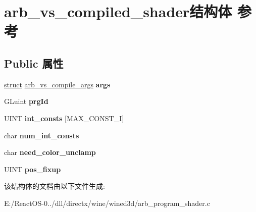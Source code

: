 \hypertarget{structarb__vs__compiled__shader}{}\section{arb\+\_\+vs\+\_\+compiled\+\_\+shader结构体 参考}
\label{structarb__vs__compiled__shader}
\subsection*{Public 属性}
\begin{DoxyCompactItemize}
\item 
\mbox{\label{structarb__vs__compiled__shader_ac6e368bfd741072b3b78e7366f7196ef}} 
\hyperlink{interfacestruct}{struct} \hyperlink{structarb__vs__compile__args}{arb\+\_\+vs\+\_\+compile\+\_\+args} {\bfseries args}
\item 
\mbox{\label{structarb__vs__compiled__shader_a8d98032739e6d1d913771788110fcd26}} 
G\+Luint {\bfseries prg\+Id}
\item 
\mbox{\label{structarb__vs__compiled__shader_a31fb159a32b6617681d70601b93ca82c}} 
U\+I\+NT {\bfseries int\+\_\+consts} \mbox{[}M\+A\+X\+\_\+\+C\+O\+N\+S\+T\+\_\+I\mbox{]}
\item 
\mbox{\label{structarb__vs__compiled__shader_a6f1096336cbf2fde23c0f594e2d504de}} 
char {\bfseries num\+\_\+int\+\_\+consts}
\item 
\mbox{\label{structarb__vs__compiled__shader_ad1267a4d94c117fb8e2edb5f0facee7e}} 
char {\bfseries need\+\_\+color\+\_\+unclamp}
\item 
\mbox{\label{structarb__vs__compiled__shader_a7749797e185c4dcc3d5d6e3ebcaf5723}} 
U\+I\+NT {\bfseries pos\+\_\+fixup}
\end{DoxyCompactItemize}


该结构体的文档由以下文件生成\+:\begin{DoxyCompactItemize}
\item 
E\+:/\+React\+O\+S-\/0../dll/directx/wine/wined3d/arb\+\_\+program\+\_\+shader.\+c\end{DoxyCompactItemize}
